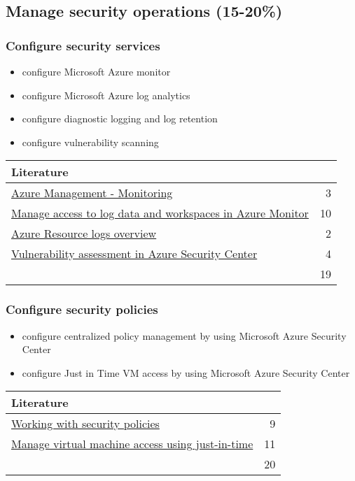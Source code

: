 \clearpage
\subsection{Manage security operations (15-20\%)}

\subsubsection{Configure security services}
\begin{itemize}
\item configure Microsoft Azure monitor 
\item configure Microsoft Azure log analytics 
\item configure diagnostic logging and log retention 
\item configure vulnerability scanning 
\end{itemize}

\begin{tabular}{p{14cm} | r}
\textbf{Literature} & \\
\hline
\href{https://docs.microsoft.com/en-us/azure/azure-monitor/azure-management}{Azure Management - Monitoring} & 3 \\
\href{https://docs.microsoft.com/en-us/azure/azure-monitor/platform/manage-access}{Manage access to log data and workspaces in Azure Monitor} & 10 \\
\href{https://docs.microsoft.com/en-us/azure/azure-monitor/platform/resource-logs-overview}{Azure Resource logs overview} & 2 \\
\href{https://docs.microsoft.com/en-us/azure/security-center/security-center-vulnerability-assessment-recommendations}{Vulnerability assessment in Azure Security Center} & 4 \\
\cline{2-2} 
 & 19 \\
\end{tabular}

\subsubsection{Configure security policies}
\begin{itemize}
\item configure centralized policy management by using Microsoft Azure Security Center 
\item configure Just in Time VM access by using Microsoft Azure Security Center 
\end{itemize}

\begin{tabular}{p{14cm} | r}
\textbf{Literature} & \\
\hline
\href{https://docs.microsoft.com/en-us/azure/security-center/tutorial-security-policy}{Working with security policies} & 9 \\
\href{https://docs.microsoft.com/en-us/azure/security-center/security-center-just-in-time}{Manage virtual machine access using just-in-time} & 11 \\
\cline{2-2} 
 & 20 \\
\end{tabular}

